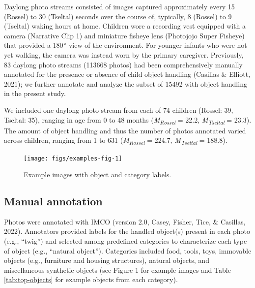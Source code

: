 \documentclass[10pt, letterpaper]{article}
\newenvironment{CodeChunk}{}{}
\begin{document}
Daylong photo streams consisted of images captured approximately every
15 (Rossel) to 30 (Tseltal) seconds over the course of, typically, 8
(Rossel) to 9 (Tseltal) waking hours at home. Children wore a recording
vest equipped with a camera (Narrative Clip 1) and miniature fisheye
lens (Photojojo Super Fisheye) that provided a 180\(\text{\textdegree}\)
view of the environment. For younger infants who were not yet walking,
the camera was instead worn by the primary caregiver. Previously, 83
daylong photo streams (113668 photos) had been comprehensively manually
annotated for the presence or absence of child object handling (Casillas
\& Elliott, 2021); we further annotate and analyze the subset of 15492
with object handling in the present study.

We included one daylong photo stream from each of 74 children (Rossel:
39, Tseltal: 35), ranging in age from 0 to 48 months
(\emph{M}\textsubscript{\emph{Rossel}} = 22.2,
\emph{M}\textsubscript{\emph{Tseltal}} = 23.3). The amount of object
handling and thus the number of photos annotated varied across children,
ranging from 1 to 631 (\emph{M}\textsubscript{\emph{Rossel}} = 224.7,
\emph{M}\textsubscript{\emph{Tseltal}} = 188.8).

\begin{CodeChunk}
\begin{figure}[h]

{\centering \texttt{[image: figs/examples-fig-1]} 

}

\caption[Example images with object and category labels]{Example images with object and category labels.}\label{fig:examples-fig}
\end{figure}
\end{CodeChunk}

\hypertarget{manual-annotation}{%
\subsection{Manual annotation}\label{manual-annotation}}

Photos were annotated with IMCO (version 2.0, Casey, Fisher, Tice, \&
Casillas, 2022). Annotators provided labels for the handled object(s)
present in each photo (e.g., ``twig'') and selected among predefined
categories to characterize each type of object (e.g., ``natural
object''). Categories included food, tools, toys, immovable objects
(e.g., furniture and housing structures), natural objects, and
miscellaneous synthetic objects (see Figure 1 for example images and
Table \ref{tab:top-objects} for example objects from each category).
\end{document}
